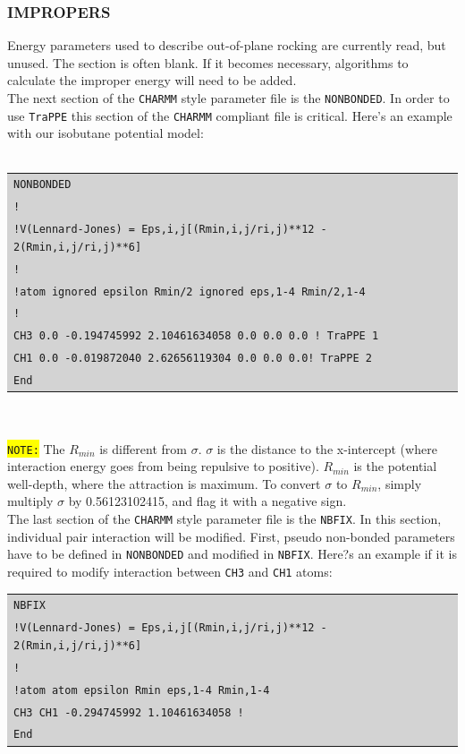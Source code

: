 \subsubsection{IMPROPERS}
Energy parameters used to describe out-of-plane rocking are currently read, but unused. The section is often blank. If it becomes necessary, algorithms to calculate the improper energy will need to be added.\\
The next section of the \texttt{CHARMM} style parameter file is the \texttt{NONBONDED}. In order to use \texttt{TraPPE} this section of the \texttt{CHARMM} compliant file is critical. Here's an example with our isobutane potential model:\\\\
\colorbox{lightgray}{
\begin{tabular}{l}
\texttt{NONBONDED }\\
\texttt{!}\\
\texttt{!V(Lennard-Jones) = Eps,i,j[(Rmin,i,j/ri,j)**12 - 2(Rmin,i,j/ri,j)**6]}\\
\texttt{!}\\
\texttt{!atom  ignored   epsilon     Rmin/2       ignored  eps,1-4  Rmin/2,1-4}\\
\texttt{!}\\
\texttt{CH3    0.0      -0.194745992  2.10461634058 0.0   0.0   0.0 ! TraPPE 1}\\
\texttt{CH1    0.0      -0.019872040  2.62656119304 0.0   0.0   0.0! TraPPE 2}\\
\texttt{End}\\
\end{tabular}}\\\\
\colorbox{yellow}{\texttt{NOTE:}} The \texttt{$R_{min}$} is different from \texttt{$\sigma$}. \texttt{$\sigma$} is the distance to the x-intercept (where interaction energy goes from being repulsive to positive). \texttt{$R_{min}$} is the potential well-depth, where the attraction is maximum. To convert \texttt{$\sigma$} to \texttt{$R_{min}$}, simply multiply \texttt{$\sigma$} by 0.56123102415, and flag it with a negative sign.\\
The last section of the \texttt{CHARMM} style parameter file is the \texttt{NBFIX}. In this section, individual pair interaction will be modified. First, pseudo non-bonded parameters have to be defined in \texttt{NONBONDED} and modified in \texttt{NBFIX}. Here?s an example if it is required to modify interaction between \texttt{CH3} and \texttt{CH1} atoms:\\
\colorbox{lightgray}{
\begin{tabular}{l}
\texttt{NBFIX }\\
\texttt{!V(Lennard-Jones) = Eps,i,j[(Rmin,i,j/ri,j)**12 - 2(Rmin,i,j/ri,j)**6]}\\
\texttt{!}\\
\texttt{!atom  atom  epsilon      Rmin  eps,1-4  Rmin,1-4}\\
\texttt{CH3   CH1    -0.294745992 1.10461634058 ! }\\
\texttt{End}\\
\end{tabular}}\\\\

